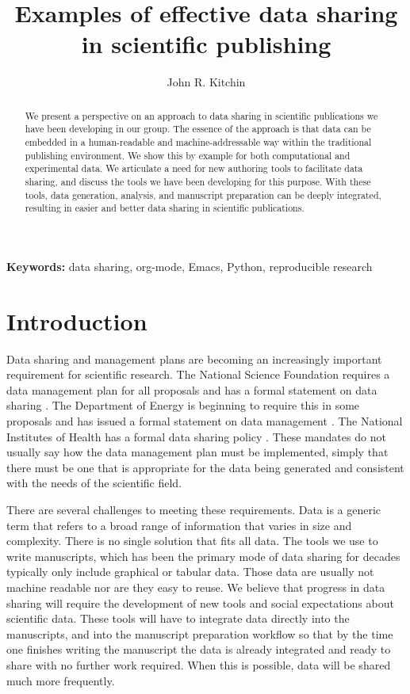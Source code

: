 \documentclass[journal=accacs,manuscript=article,email=true]{achemso}
\author{John R. Kitchin}
\affiliation{Department of Chemical Engineering, Carnegie Mellon University, 5000 Forbes Ave, Pittsburgh, PA 15213}
\date{}
\title{Examples of effective data sharing in scientific publishing}
\begin{document}
\begin{abstract}
We present a perspective on an approach to data sharing in scientific publications we have been developing in our group. The essence of the approach is that data can be embedded in a human-readable and machine-addressable way within the traditional publishing environment. We show this by example for both computational and experimental data. We articulate a need for new authoring tools to facilitate data sharing, and discuss the tools we have been developing for this purpose. With these tools, data generation, analysis, and manuscript preparation can be deeply integrated, resulting in easier and better data sharing in scientific publications.
\end{abstract}

\textbf{Keywords:} data sharing, org-mode, Emacs, Python, reproducible research

\section{Introduction}
\label{sec-1}
Data sharing and management plans are becoming an increasingly important requirement for scientific research. The National Science Foundation requires a data management plan \cite{foundation-nsf-data} for all proposals and has a formal statement on data sharing \cite{foundation-dissem-sharin}. The Department of Energy is beginning to require this in some proposals and has issued a formal statement on data management \cite{energy-statem-digit}. The National Institutes of Health has a formal data sharing policy \cite{health-nih-data}. These mandates do not usually say how the data management plan must be implemented, simply that there must be one that is appropriate for the data being generated and consistent with the needs of the scientific field.

There are several challenges to meeting these requirements. Data is a generic term that refers to a broad range of information that varies in size and complexity. There is no single solution that fits all data. The tools we use to write manuscripts, which has been the primary mode of data sharing for decades typically only include graphical or tabular data. Those data are usually not machine readable nor are they easy to reuse. We believe that progress in data sharing will require the development of new tools and social expectations about scientific data. These tools will have to integrate data directly into the manuscripts, and into the manuscript preparation workflow so that by the time one finishes writing the manuscript the data is already integrated and ready to share with no further work required. When this is possible, data will be shared much more frequently.
\end{document}
